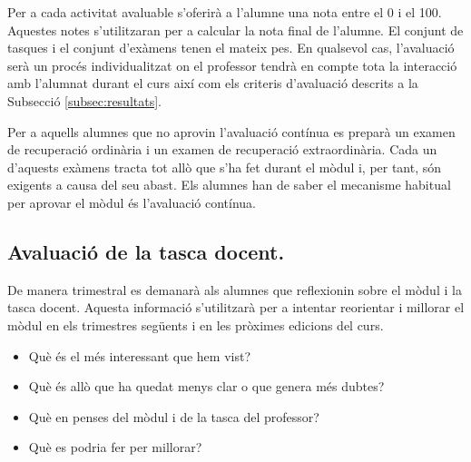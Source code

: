 \documentclass[catalan, a4paper, 12pt, titlepage]{article}
\begin{document}
Per a cada activitat avaluable s'oferirà a l'alumne una nota entre el 0 i el 100.
Aquestes notes s'utilitzaran per a calcular la nota final de l'alumne.
El conjunt de tasques i el conjunt d'exàmens tenen el mateix pes.
En qualsevol cas, l'avaluació serà un procés individualitzat on el professor tendrà en compte tota la interacció amb l'alumnat durant el curs així com els criteris d'avaluació descrits a la Subsecció \ref{subsec:resultats}.

%

Per a aquells alumnes que no aprovin l'avaluació contínua es preparà un examen de recuperació ordinària i un examen de recuperació extraordinària. Cada un d'aquests exàmens tracta tot allò que s'ha fet durant el mòdul i, per tant, són exigents a causa del seu abast. Els alumnes han de saber el mecanisme habitual per aprovar el mòdul és l'avaluació contínua.

\subsection{Avaluació de la tasca docent.}

De manera trimestral es demanarà als alumnes que reflexionin sobre el mòdul i la tasca docent. Aquesta informació s'utilitzarà per a intentar reorientar i millorar el mòdul en els trimestres següents i en les pròximes edicions del curs. 

\begin{itemize}
	\item Què és el més interessant que hem vist?
	\item Què és allò que ha quedat menys clar o que genera més dubtes?
	\item Què en penses del mòdul i de la tasca del professor?
	\item Què es podria fer per millorar?
\end{itemize}
\end{document}

